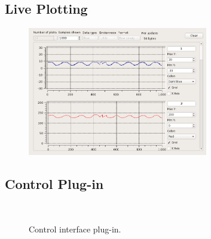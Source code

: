 \subsection{Live Plotting}

\begin{figure}
\centering
\includegraphics[width=0.7\textwidth]{images/gui/plotting}
\end{figure}

\subsection{Control Plug-in}

\begin{figure}
\centering
{}
~
\caption{Control interface plug-in.}
\label{fig:Control interface plug-in} 
\end{figure}